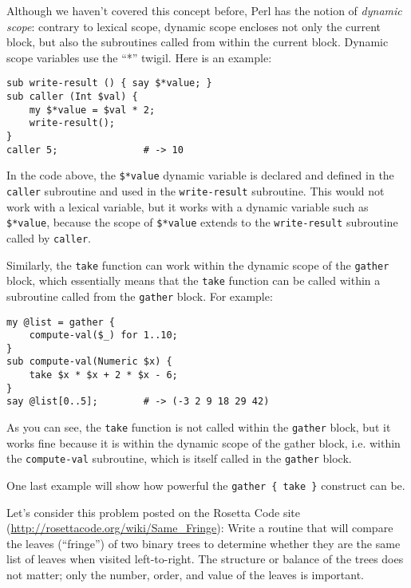 Although we haven't covered this concept before, 
Perl has the notion of \emph{dynamic scope}: contrary 
to lexical scope, dynamic scope encloses not only 
the current block, but also the subroutines called 
from within the current block. Dynamic scope variables 
use the ``*'' twigil. Here is an example:
%
\begin{verbatim}
sub write-result () { say $*value; }
sub caller (Int $val) { 
    my $*value = $val * 2; 
    write-result();
}
caller 5;               # -> 10
\end{verbatim}
%
In the code above, the \verb'$*value' dynamic variable 
is declared and defined in the \verb'caller' subroutine 
and used in the \verb'write-result' subroutine. This would not 
work with a lexical variable, but it works with a dynamic 
variable such as \verb'$*value', because the scope of 
\verb'$*value' extends to the \verb'write-result' subroutine 
called by \verb'caller'. 

Similarly, the {\tt take} function 
can work within the dynamic scope of the \verb'gather' 
block, which essentially means that the {\tt take} 
function can be called within a subroutine called from 
the \verb'gather' block. For example:

\begin{verbatim}
my @list = gather {
    compute-val($_) for 1..10; 
}
sub compute-val(Numeric $x) {
    take $x * $x + 2 * $x - 6;
}
say @list[0..5];        # -> (-3 2 9 18 29 42)
\end{verbatim}

As you can see, the {\tt take} function is not called 
within the {\tt gather} block, but it works fine because 
it is within the dynamic scope of the gather block, i.e. 
within the {\tt compute-val} subroutine, which is itself 
called in the {\tt gather} block.

One last example will show how powerful the 
\verb'gather { take }' construct can be.

Let's consider this problem posted on the Rosetta Code 
site (\url{http://rosettacode.org/wiki/Same_Fringe}): 
Write a routine that will compare the leaves (``fringe'') 
of two binary trees to determine whether they are the 
same list of leaves when visited left-to-right. The 
structure or balance of the trees does not matter; 
only the number, order, and value of the leaves is 
important. 

